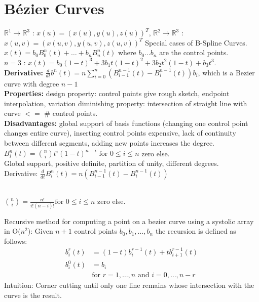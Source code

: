 \section{Bézier Curves}

 $\mathbb{R}^1 \to \mathbb{R}^3$ : $x(u) = (x(u), y(u), z(u))^T$, $\mathbb{R}^2 \to \mathbb{R}^3$ : $x(u,v) = (x(u,v), y(u,v), z(u,v))^T$
Special cases of B-Spline Curves. \\
${x}(t) = b_0 B_0^n(t) + \dots + b_n B_n^n(t)$ where $b_0 ...b_n$ are the control points. 
\\
$n = 3 $ : ${x}(t) = b_0(1-t)^3 + 3b_1t(1-t)^2 + 3b_2t^2(1-t) + b_3t^3$. 
\\
\textbf{Derivative:} $\frac{d}{dt} b^n(t) = n \sum_{i=0}^{n} \left( B_{i-1}^{n-1}(t) - B_i^{n-1}(t) \right) b_i$, which is a Bezier curve with degree $n - 1$\\
\textbf{Properties:} design property: control points give rough sketch, endpoint interpolation, variation diminishing property: intersection of straight line with curve $<=$ \# control points.\\
\textbf{Disadvantages:} global support of basis functions (changing one control point changes entire curve), inserting control points expensive, lack of continuity between different segments, adding new points increases the degree.\\
$B_i^n(t) = \binom{n}{i} t^i (1 - t)^{n-i} \text{ for } 0 \leq i \leq n$ zero else. 
\\
Global support, positive definite, partition of unity, different degrees. 
\\
Derivative: $\frac{d}{dt} B_i^n(t) = n \left( B_{i-1}^{n-1}(t) - B_i^{n-1}(t) \right)$


\\
$\binom{n}{i} = \frac{n!}{i!(n-i)!} \text{for } 0 \leq i \leq n$ zero else.

Recursive method for computing a point on a bezier curve using a systolic array in O($n^2$):
Given \( n+1 \) control points \( b_0, b_1, \ldots, b_n \) the recursion is defined as follows:
\begin{align*}
b_i^r(t) &= (1 - t) b_i^{r-1}(t) + t b_{i+1}^{r-1}(t) \\
b_i^0(t) &= b_i \\
&\text{for } r = 1, \ldots, n \text{ and } i = 0, \ldots, n-r
\end{align*}
Intuition: Corner cutting until only one line remains whose intersection with the curve is the result. 

